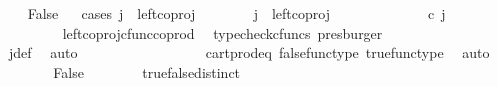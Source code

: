 \begin{isabellebody}
\ \ \isamarkupfalse%
\ False\isanewline
\ \ \isamarkupfalse%
{\isacharparenleft}{\kern0pt}cases\ {\isachardoublequoteopen}j\ {\isacharequal}{\kern0pt}\ left{\isacharunderscore}{\kern0pt}coproj\ {\isasymone}\ {\isasymone}{\isachardoublequoteclose}{\isacharparenright}{\kern0pt}\isanewline
\ \ \ \ \isamarkupfalse%
\ {\isachardoublequoteopen}j\ {\isacharequal}{\kern0pt}\ left{\isacharunderscore}{\kern0pt}coproj\ {\isasymone}\ {\isasymone}{\isachardoublequoteclose}\isanewline
\ \ \ \ \isamarkupfalse%
\ \isamarkupfalse%
\ {\isachardoublequoteopen}{\isacharparenleft}{\kern0pt}{\isasymlangle}{\isasymt}{\isacharcomma}{\kern0pt}\ {\isasymf}{\isasymrangle}\ {\isasymamalg}{\isasymlangle}{\isasymf}{\isacharcomma}{\kern0pt}\ {\isasymt}{\isasymrangle}{\isacharparenright}{\kern0pt}\ {\isasymcirc}\isactrlsub c\ j\ \ {\isacharequal}{\kern0pt}\ {\isasymlangle}{\isasymt}{\isacharcomma}{\kern0pt}\ {\isasymf}{\isasymrangle}{\isachardoublequoteclose}\isanewline
\ \ \ \ \ \ \isamarkupfalse%
\ \ left{\isacharunderscore}{\kern0pt}coproj{\isacharunderscore}{\kern0pt}cfunc{\isacharunderscore}{\kern0pt}coprod\ \isamarkupfalse%
\ {\isacharparenleft}{\kern0pt}typecheck{\isacharunderscore}{\kern0pt}cfuncs{\isacharcomma}{\kern0pt}\ presburger{\isacharparenright}{\kern0pt}\isanewline
\ \ \ \ \isamarkupfalse%
\ \isamarkupfalse%
\ {\isachardoublequoteopen}{\isasymlangle}{\isasymt}{\isacharcomma}{\kern0pt}\ {\isasymf}{\isasymrangle}\ {\isacharequal}{\kern0pt}\ {\isasymlangle}{\isasymf}{\isacharcomma}{\kern0pt}{\isasymf}{\isasymrangle}{\isachardoublequoteclose}\isanewline
\ \ \ \ \ \ \isamarkupfalse%
\ j{\isacharunderscore}{\kern0pt}def\ \isamarkupfalse%
\ auto\isanewline
\ \ \ \ \isamarkupfalse%
\ \isamarkupfalse%
\ {\isachardoublequoteopen}{\isasymt}\ {\isacharequal}{\kern0pt}\ {\isasymf}{\isachardoublequoteclose}\isanewline
\ \ \ \ \ \ \isamarkupfalse%
\ cart{\isacharunderscore}{\kern0pt}prod{\isacharunderscore}{\kern0pt}eq{}\ false{\isacharunderscore}{\kern0pt}func{\isacharunderscore}{\kern0pt}type\ true{\isacharunderscore}{\kern0pt}func{\isacharunderscore}{\kern0pt}type\ \isamarkupfalse%
\ auto\isanewline
\ \ \ \ \isamarkupfalse%
\ \isamarkupfalse%
\ False\isanewline
\ \ \ \ \ \ \isamarkupfalse%
\ true{\isacharunderscore}{\kern0pt}false{\isacharunderscore}{\kern0pt}distinct\ \isamarkupfalse%

\end{isabellebody}
